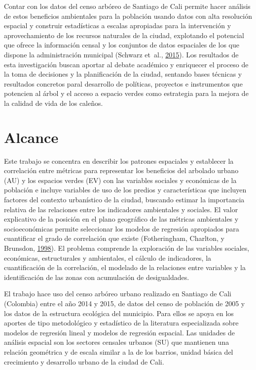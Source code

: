 \documentclass[12pt,a4paper,openany]{book}
\theoremstyle{definition}
\theoremstyle{definition}
\theoremstyle{definition}
\theoremstyle{remark}
\begin{document}
Contar con los datos del censo arbóreo de Santiago de Cali permite hacer
análisis de estos beneficios ambientales para la población usando datos
con alta resolución espacial y construir estadísticas a escalas
apropiadas para la intervención y aprovechamiento de los recursos
naturales de la ciudad, explotando el potencial que ofrece la
información censal y los conjuntos de datos espaciales de los que
dispone la administración municipal (Schwarz et~al.,
\protect\hyperlink{ref-schwarz_trees_2015}{2015}). Los resultados de
esta investigación buscan aportar al debate académico y enriquecer el
proceso de la toma de decisiones y la planificación de la ciudad,
sentando bases técnicas y resultados concretos paral desarrollo de
políticas, proyectos e instrumentos que potencien al árbol y el acceso a
espacio verdes como estrategia para la mejora de la calidad de vida de
los caleños.

\section{Alcance}\label{alcance}

Este trabajo se concentra en describir los patrones espaciales y
establecer la correlación entre métricas para representar los beneficios
del arbolado urbano (AU) y los espacios verdes (EV) con las variables
sociales y económicas de la población e incluye variables de uso de los
predios y características que incluyen factores del contexto urbanístico
de la ciudad, buscando estimar la importancia relativa de las relaciones
entre los indicadores ambientales y sociales. El valor explicativo de la
posición en el plano geográfico de las métricas ambientales y
socioeconómicas permite seleccionar los modelos de regresión apropiados
para cuantificar el grado de correlación que existe (Fotheringham,
Charlton, y Brunsdon,
\protect\hyperlink{ref-fotheringham_geographically_1998}{1998}). El
problema comprende la exploración de las variables sociales, económicas,
estructurales y ambientales, el cálculo de indicadores, la
cuantificación de la correlación, el modelado de la relaciones entre
variables y la identificación de las zonas con acumulación de
desigualdades.

El trabajo hace uso del censo arbóreo urbano realizado en Santiago de
Cali (Colombia) entre el año 2014 y 2015, de datos del censo de
población de 2005 y los datos de la estructura ecológica del municipio.
Para ellos se apoya en los aportes de tipo metodológico y estadístico de
la literatura especializada sobre modelos de regresión lineal y modelos
de regresión espacial. Las unidades de análisis espacial son los
sectores censales urbanos (SU) que mantienen una relación geométrica y
de escala similar a la de los barrios, unidad básica del crecimiento y
desarrollo urbano de la ciudad de Cali.
\end{document}

